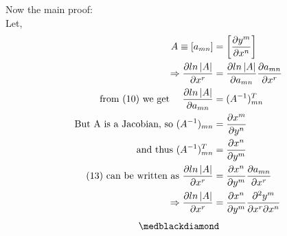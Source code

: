 Now the main proof:\\
Let, 
\begin{align}
\ A \equiv \left[ a_{mn}\right] &= \left[ \pdv{y^m}{x^n}\right]\\
\Rightarrow \pdv{ln\left|A\right|}{x^r} &= \pdv{ln\left|A\right|}{a_{mn}}\pdv{a_{mn}}{x^r}\\
\text{from (10) we get }\quad \pdv{ln\left|A\right|}{a_{mn}} &= (A^{-1})^T_{mn}\\
\text{But A is a Jacobian, so } (A^{-1})_{mn} &= \pdv{x^m}{y^n}\\
\text{ and thus  }(A^{-1})^T_{mn} &=  \pdv{x^n}{y^m}\\
\text{(13) can be written as }  \pdv{ln\left|A\right|}{x^r} &=  \pdv{x^n}{y^m}\pdv{a_{mn}}{x^r}\\
\Rightarrow \pdv{ln\left|A\right|}{x^r} &=  \pdv{x^n}{y^m}\pdv{y^m}{x^r}{x^n}
\end{align}
$$\medblackdiamond$$
\pagebreak[4]

